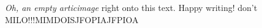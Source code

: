 \textit{Oh, an empty articimage} right onto this text. Happy writing! 
don't MILO!!!MIMDOISJFOPIAJFPIOA